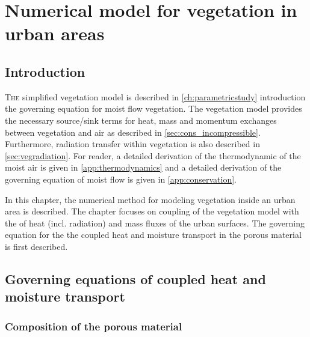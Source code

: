 \chapter{Numerical model for vegetation in urban areas}
\label{ch:numericalmethod}
\def\figdir{chapters/ch07_numericalmodel/figures}	

\section{Introduction}

\lettrine[lines=3,nindent=0em,loversize=0.1]{T}{he} simplified vegetation model is described in \cref{ch:parametricstudy} introduction the governing equation for moist flow vegetation. The vegetation model provides the necessary source/sink terms for heat, mass and momentum exchanges between vegetation and air as described in \cref{sec:cons_incompressible}. Furthermore, radiation transfer within vegetation is also described in \cref{sec:vegradiation}. For reader, a detailed derivation of the thermodynamic of the moist air is given in \cref{app:thermodynamics} and a detailed derivation of the governing equation of moist flow is given in \cref{app:conservation}. 

In this chapter, the numerical method for modeling vegetation inside an urban area is described. The chapter focuses on coupling of the vegetation model with the of heat (incl. radiation) and mass fluxes of the urban surfaces. The governing  equation for the the coupled heat and moisture transport in the porous material is first described.

\section{Governing equations of coupled heat and moisture transport}

\subsection{Composition of the porous material}

